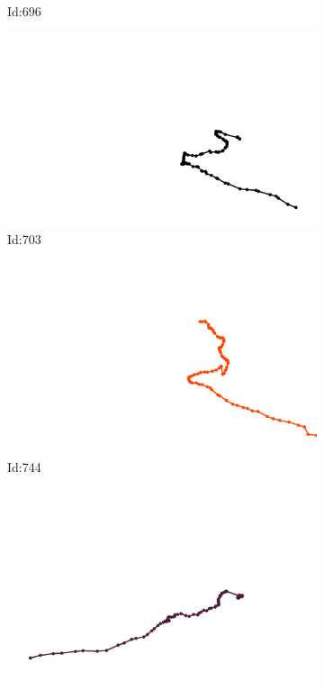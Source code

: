 \documentclass[12pt,twoside]{report}
\begin{document}
\begin{figure}
\begin{subfigure}[b]{0.20\textwidth}
\caption{Id:696}
\end{subfigure}
\begin{subfigure}[b]{0.20\textwidth}
\centering
\includegraphics[width=\textwidth]{../trajectories/703.png}
\caption{Id:703}
\end{subfigure}
\begin{subfigure}[b]{0.20\textwidth}
\centering
\includegraphics[width=\textwidth]{../trajectories/744.png}
\caption{Id:744}
\end{subfigure}
\begin{subfigure}[b]{0.20\textwidth}
\centering
\includegraphics[width=\textwidth]{../trajectories/753.png}

\end{subfigure}
\end{figure}
\end{document}
